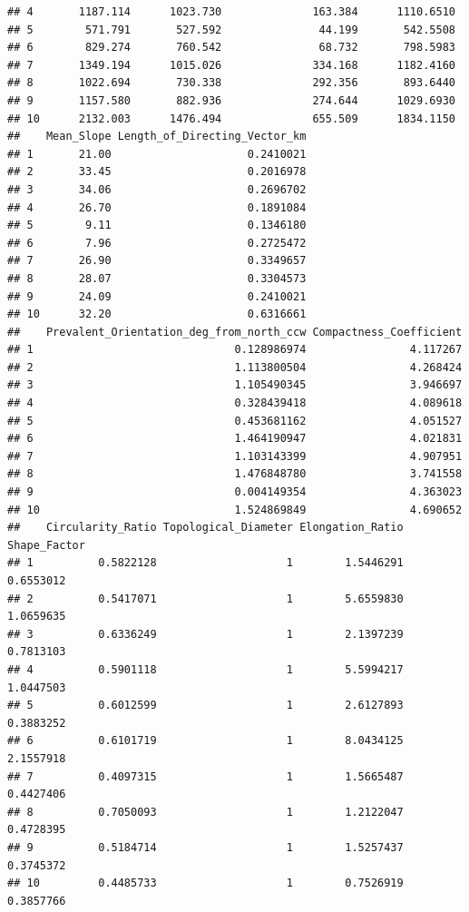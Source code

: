 \documentclass[11pt,]{article}
\begin{document}
\begin{verbatim}
## 4       1187.114      1023.730              163.384      1110.6510
## 5        571.791       527.592               44.199       542.5508
## 6        829.274       760.542               68.732       798.5983
## 7       1349.194      1015.026              334.168      1182.4160
## 8       1022.694       730.338              292.356       893.6440
## 9       1157.580       882.936              274.644      1029.6930
## 10      2132.003      1476.494              655.509      1834.1150
##    Mean_Slope Length_of_Directing_Vector_km
## 1       21.00                     0.2410021
## 2       33.45                     0.2016978
## 3       34.06                     0.2696702
## 4       26.70                     0.1891084
## 5        9.11                     0.1346180
## 6        7.96                     0.2725472
## 7       26.90                     0.3349657
## 8       28.07                     0.3304573
## 9       24.09                     0.2410021
## 10      32.20                     0.6316661
##    Prevalent_Orientation_deg_from_north_ccw Compactness_Coefficient
## 1                               0.128986974                4.117267
## 2                               1.113800504                4.268424
## 3                               1.105490345                3.946697
## 4                               0.328439418                4.089618
## 5                               0.453681162                4.051527
## 6                               1.464190947                4.021831
## 7                               1.103143399                4.907951
## 8                               1.476848780                3.741558
## 9                               0.004149354                4.363023
## 10                              1.524869849                4.690652
##    Circularity_Ratio Topological_Diameter Elongation_Ratio Shape_Factor
## 1          0.5822128                    1        1.5446291    0.6553012
## 2          0.5417071                    1        5.6559830    1.0659635
## 3          0.6336249                    1        2.1397239    0.7813103
## 4          0.5901118                    1        5.5994217    1.0447503
## 5          0.6012599                    1        2.6127893    0.3883252
## 6          0.6101719                    1        8.0434125    2.1557918
## 7          0.4097315                    1        1.5665487    0.4427406
## 8          0.7050093                    1        1.2122047    0.4728395
## 9          0.5184714                    1        1.5257437    0.3745372
## 10         0.4485733                    1        0.7526919    0.3857766

\end{verbatim}
\end{document}
